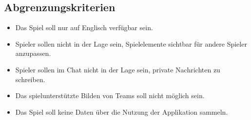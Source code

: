 \subsection{Abgrenzungskriterien}
\begin{itemize}
	\item Das Spiel soll nur auf Englisch verfügbar sein.
	\item Spieler sollen nicht in der Lage sein, Spielelemente sichtbar für andere Spieler anzupassen.
	\item Spieler sollen im Chat nicht in der Lage sein, private Nachrichten zu schreiben.
	\item Das spielunterstützte Bilden von Teams soll nicht möglich sein.
	\item Das Spiel soll keine Daten über die Nutzung der Applikation sammeln.
\end{itemize}
